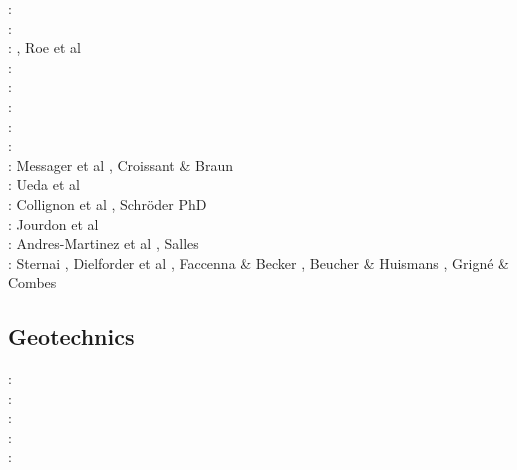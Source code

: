 \begin{scriptsize}
\twothousandsix:      \cite{rosw06}\cite{brau06}\cite{bocr06}\cite{simp06}\cite{stwr06}\cite{golc06}\\
\twothousandseven:    \cite{buto07}\cite{sebp07}\cite{tomk07}\cite{strw07}\\
\twothousandeight:    \cite{alle08}, Roe et al \cite{rowf08}\\
\twothousandnine:     \cite{whip09}\cite{kuhe09}\cite{makh09}\cite{pina09}\cite{dala09}\cite{bonn09}\\
\twothousandten:      \cite{will10}\cite{tuha10}\cite{brau10}\cite{brau10}\cite{brya10}\cite{crmw10}\\
\twothousandeleven:   \cite{robr11}\cite{grhd11}\\
\twothousandtwelve:   \cite{kiwh12}\cite{brvv12}\\
\twothousandthirteen: \cite{vehc13}\cite{brwi13}\cite{fihv13a}\cite{fihv13b}
                      \cite{brrs13}\cite{chgz13}\cite{tuva13}\cite{caya13} \\
\twothousandfourteen: Messager et al \cite{mehn14}, Croissant \& Braun \cite{crbr14}
                      \cite{cokm14}\cite{erhv14}\cite{erhv15}\cite{stsc14}\cite{olbm14} \\
\twothousandfifteen:  Ueda et al \cite{uewg15,fohk15,cofk15}\\
\twothousandsixteen:  Collignon et al \cite{coyc16}, Schr{\"o}der PhD \cite{schr16}\\
\twothousandeighteen: Jourdon et al \cite{jolp18}\\
\twothousandnineteen: Andres-Martinez et al \cite{anpa19}, Salles \cite{sall19}\\
\twothousandtwenty:   Sternai \cite{ster20}, Dielforder et al \cite{diho20}, Faccenna \& Becker \cite{fabe20},
                      Beucher \& Huismans \cite{behu20}, Grign\'e \& Combes \cite{grco20}
\end{scriptsize}

\subsection{Geotechnics}

\begin{scriptsize}
\nineteenninetynine: \cite{ster99}\\
\twothousandthree: \cite{gora03}\cite{zhll03}\\
\twothousandfour: \cite{gour04}\\
\twothousandsix: \cite{gork06}\\
\twothousandfourteen: \cite{bufy14}
\end{scriptsize}

